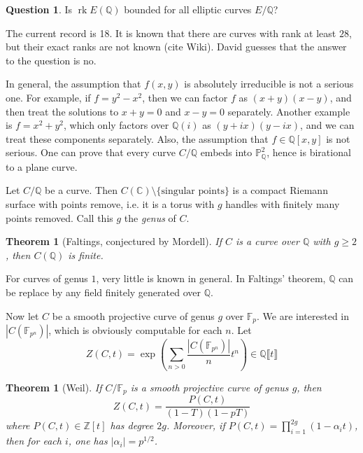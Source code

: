 \documentclass{article}
\newtheorem{theorem}[subsection]{Theorem}
\theoremstyle{definition}
\newtheorem{question}[subsection]{Question}
\begin{document}
\begin{question}
Is $\operatorname{rk} E(\mathbb{Q})$ bounded for all elliptic curves 
$E/\mathbb{Q}$?
\end{question}

The current record is 18. It is known that there are curves with rank at least 
$28$, but their exact ranks are not known (cite Wiki). David guesses that 
the answer to the question is no. 

In general, the assumption that $f(x,y)$ is absolutely irreducible is not a 
serious one. For example, if $f=y^2-x^2$, then we can factor $f$ as 
$(x+y)(x-y)$, and then treat the solutions to $x+y=0$ and $x-y=0$ separately. 
Another example is $f=x^2+y^2$, which only factors over $\mathbb{Q}(i)$ as 
$(y+i x)(y-i x)$, and we can treat these components separately. Also, the 
assumption that $f\in \mathbb{Q}[x,y]$ is not serious. One can prove that 
every curve $C/\mathbb{Q}$ embeds into $\mathbb{P}^2_\mathbb{Q}$, hence is 
birational to a plane curve. 

Let $C/\mathbb{Q}$ be a curve. Then 
$C(\mathbb{C})\setminus \{\text{singular points}\}$ is a compact Riemann 
surface with points remove, i.e. it is a torus with $g$ handles with finitely 
many points removed. Call this $g$ the \emph{genus} of $C$. 

\begin{theorem}[Faltings, conjectured by Mordell]
If $C$ is a curve over $\mathbb{Q}$ with $g\geqslant 2$, then $C(\mathbb{Q})$ 
is finite. 
\end{theorem}

For curves of genus $1$, very little is known in general. In Faltings' 
theorem, $\mathbb{Q}$ can be replace by any field finitely generated over 
$\mathbb{Q}$. 

Now let $C$ be a smooth projective curve of genus $g$ over $\mathbb{F}_p$. 
We are interested in $|C(\mathbb{F}_{p^n})|$, which is obviously computable 
for each $n$. Let 
\[
  Z(C,t) = \exp\left( \sum_{n>0} \frac{|C(\mathbb{F}_{p^n})|}{n} t^n \right) \in \mathbb{Q}\llbracket t\rrbracket 
\]

\begin{theorem}[Weil]
If $C/\mathbb{F}_p$ is a smooth projective curve of genus $g$, then 
\[
  Z(C,t) = \frac{P(C,t)}{(1-T)(1-p T)}
\]
where $P(C,t)\in \mathbb{Z}[t]$ has degree $2 g$. Moreover, if 
$P(C,t) = \prod_{i=1}^{2 g} (1-\alpha_i t)$, then for each $i$, one has 
$|\alpha_i|=p^{1/2}$. 
\end{theorem}
\end{document}
